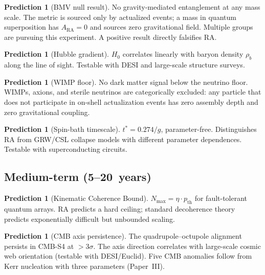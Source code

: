 \documentclass[11pt,a4paper]{article}
\theoremstyle{plain}
\theoremstyle{definition}
\newtheorem{prediction}[theorem]{Prediction}
\theoremstyle{remark}
\newcommand{\ARA}{A_{\mathrm{RA}}}
\begin{document}
\begin{prediction}[BMV null result]\label{pred:bmv}
No gravity-mediated entanglement at any mass scale.  The metric is sourced only
by actualized events; a mass in quantum superposition has $\ARA = 0$ and sources
zero gravitational field.  Multiple groups are pursuing this experiment.  A
positive result directly falsifies RA.
\end{prediction}

\begin{prediction}[Hubble gradient]\label{pred:hubble}
$H_0$ correlates linearly with baryon density $\rho_b$ along the line of sight.
Testable with DESI and large-scale structure surveys.
\end{prediction}

\begin{prediction}[WIMP floor]\label{pred:wimp}
No dark matter signal below the neutrino floor.  WIMPs, axions, and sterile
neutrinos are categorically excluded: any particle that does not participate in
on-shell actualization events has zero assembly depth and zero gravitational
coupling.
\end{prediction}

\begin{prediction}[Spin-bath timescale]\label{pred:spinbath}
$t^* = 0.274/g$, parameter-free.  Distinguishes RA from GRW/CSL collapse models
with different parameter dependences.  Testable with superconducting circuits.
\end{prediction}

\subsection{Medium-term (5--20~years)}\label{sec:pred-medium}

\begin{prediction}[Kinematic Coherence Bound]\label{pred:kcb}
$N_{\max} = \eta \cdot p_{\mathrm{th}}$ for fault-tolerant quantum arrays.  RA
predicts a hard ceiling; standard decoherence theory predicts exponentially
difficult but unbounded scaling.
\end{prediction}

\begin{prediction}[CMB axis persistence]\label{pred:cmb}
The quadrupole--octupole alignment persists in CMB-S4 at $> 3\sigma$.  The axis
direction correlates with large-scale cosmic web orientation (testable with
DESI/Euclid).  Five CMB anomalies follow from Kerr nucleation with three
parameters (Paper~III).
\end{prediction}
\end{document}
